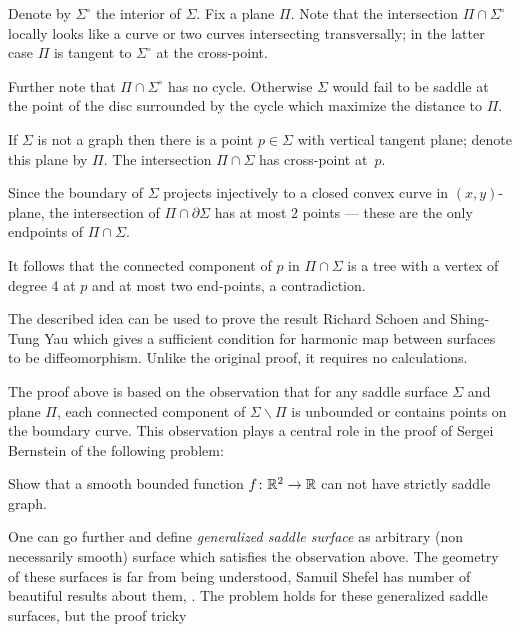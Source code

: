 Denote by $\Sigma^\circ$ the interior of $\Sigma$.
Fix a plane $\Pi$. 
Note that the intersection $\Pi\cap \Sigma^\circ$ 
locally  looks like a curve or two curves intersecting transversally;
in the latter case $\Pi$ is tangent to $\Sigma^\circ$ at the cross-point.

Further note that $\Pi\cap \Sigma^\circ$ has no cycle.
Otherwise $\Sigma$ would fail to be saddle at the point of the disc surrounded by the cycle which maximize the distance to $\Pi$.

If $\Sigma$ is not a graph then there is a point $p\in\Sigma$ with vertical tangent plane;
denote this plane by $\Pi$.
The intersection $\Pi\cap\Sigma$ has cross-point at~$p$.

Since the boundary of $\Sigma$ projects injectively to a closed convex curve in $(x,y)$-plane,
the intersection of $\Pi\cap\partial \Sigma$ has at most 2 points --- these are the only endpoints of $\Pi\cap\Sigma$.

It follows that the connected component of $p$ in $\Pi\cap\Sigma$ is a tree 
with a vertex of degree 4 at $p$ and at most two end-points, a contradiction.\qeds

The described idea can be used to prove the result Richard Schoen and Shing-Tung  Yau \cite[see][]{schoen-yau-2D} which gives a sufficient condition for harmonic map between surfaces to be diffeomorphism.
Unlike the original proof, it requires no calculations.

The proof above is based on the observation 
that for any saddle surface $\Sigma$ and plane $\Pi$,
each connected component of $\Sigma\backslash \Pi$ is unbounded or contains points on the boundary curve.
This observation plays a central role in the proof of Sergei Bernstein \cite[see][]{bernshtein}
of the following problem:

\begin{pr}
Show that a smooth bounded function $f\colon\mathbb{R}^2\to\mathbb{R}$ can not have strictly saddle graph.
\end{pr}

One can go further and define \emph{generalized saddle surface} as arbitrary (non necessarily smooth) surface which satisfies the observation above.
The geometry of these surfaces is far from being understood,
Samuil Shefel has number of beautiful results about them, 
\cite[see][and the references there in]{shefel, AKP-invitation}.
The problem holds for these generalized saddle surfaces, but
the proof tricky \cite[see][]{petrunin-stadler}


